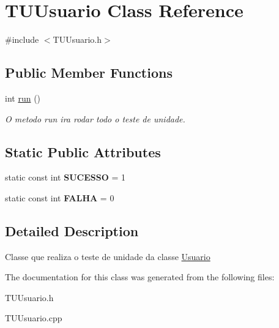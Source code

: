 \hypertarget{classTUUsuario}{}\section{T\+U\+Usuario Class Reference}
\label{classTUUsuario}


{\ttfamily \#include $<$T\+U\+Usuario.\+h$>$}

\subsection*{Public Member Functions}
\begin{DoxyCompactItemize}
\item 
int \hyperlink{classTUUsuario_af12e1b9020cfb11a1f659373a70268fa}{run} ()\hypertarget{classTUUsuario_af12e1b9020cfb11a1f659373a70268fa}{}\label{classTUUsuario_af12e1b9020cfb11a1f659373a70268fa}

\begin{DoxyCompactList}\small\item\em O metodo run ira rodar todo o teste de unidade. \end{DoxyCompactList}\end{DoxyCompactItemize}
\subsection*{Static Public Attributes}
\begin{DoxyCompactItemize}
\item 
static const int {\bfseries S\+U\+C\+E\+S\+SO} = 1\hypertarget{classTUUsuario_aa9302e7d6f13452c83f21224fd335e54}{}\label{classTUUsuario_aa9302e7d6f13452c83f21224fd335e54}

\item 
static const int {\bfseries F\+A\+L\+HA} = 0\hypertarget{classTUUsuario_af1a7217e0d002f0d0b524c901bb75c98}{}\label{classTUUsuario_af1a7217e0d002f0d0b524c901bb75c98}

\end{DoxyCompactItemize}


\subsection{Detailed Description}
Classe que realiza o teste de unidade da classe \hyperlink{classUsuario}{Usuario} 

The documentation for this class was generated from the following files\+:\begin{DoxyCompactItemize}
\item 
T\+U\+Usuario.\+h\item 
T\+U\+Usuario.\+cpp\end{DoxyCompactItemize}

